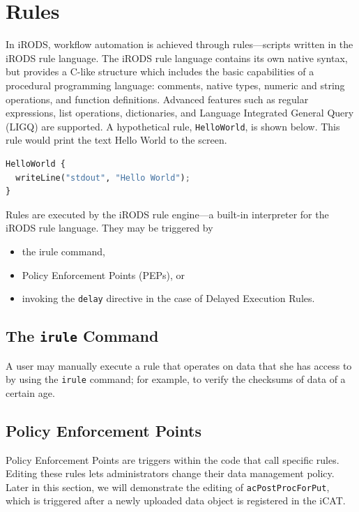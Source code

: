 \documentclass[10pt,oneside]{memoir}
\begin{document}
\section{Rules}

In iRODS, workflow automation is achieved through rules---scripts written in the iRODS rule language. The iRODS rule language contains its own native syntax, but provides a C-like structure which includes the basic capabilities of a procedural programming language: comments, native types, numeric and string operations, and function definitions. Advanced features such as regular expressions, list operations, dictionaries, and Language Integrated General Query (LIGQ) are supported. A hypothetical rule, \texttt{HelloWorld}, is shown below. This rule would print the text Hello World to the screen.

\begin{lstlisting}[language=python]
HelloWorld {
  writeLine("stdout", "Hello World");
}
\end{lstlisting}

Rules are executed by the iRODS rule engine---a built-in interpreter for the iRODS rule language. They may be triggered by
\begin{itemize}
 \item the irule command,
 \item Policy Enforcement Points (PEPs), or
 \item invoking the \texttt{delay} directive in the case of Delayed Execution Rules.
\end{itemize}

\subsection{The \texttt{irule} Command}

A user may manually execute a rule that operates on data that she has access to by using the \texttt{irule} command; for example, to verify the checksums of data of a certain age.

\subsection{Policy Enforcement Points}

Policy Enforcement Points are triggers within the code that call specific rules. Editing these rules lets administrators change their data management policy. Later in this section, we will demonstrate the editing of \texttt{acPostProcForPut}, which is triggered after a newly uploaded data object is registered in the iCAT.
\end{document}
